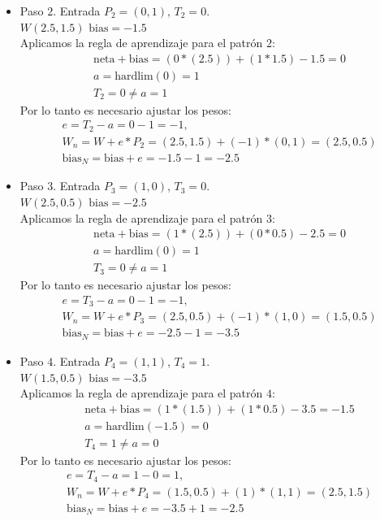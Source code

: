 \documentclass{article}
\begin{document}
{{\begin{itemize}
\begin{itemize}
\item Paso $2$. Entrada $P_2 = (0, 1)$, $T_2 = 0$. \\
$W(2.5, 1.5)$  $\text{bias} = -1.5$ \\

Aplicamos la regla de aprendizaje para el patrón $2$:
\begin{align*}
&\text{neta} + \text{bias}= (0 * (2.5)) + (1 * 1.5) - 1.5 = 0\\
&a = \text{hardlim}(0) = 1 \\
&T_2 = 0 \neq a = 1
\end{align*}
Por lo tanto es necesario ajustar los pesos:
\begin{align*}
&e = T_2 - a = 0- 1 =  -1, \\
&W_n = W + e* P_2 = (2.5, 1.5) + (-1) * (0,1) = (2.5, 0.5) \\
&\text{bias}_N = \text{bias} + e = -1.5 - 1 = -2.5
\end{align*}

\item Paso $3$. Entrada $P_3 = (1, 0)$, $T_3 = 0$. \\
$W(2.5, 0.5)$  $\text{bias} = -2.5$ \\

Aplicamos la regla de aprendizaje para el patrón $3$:
\begin{align*}
&\text{neta} + \text{bias}= (1 * (2.5)) + (0 * 0.5) - 2.5 = 0\\
&a = \text{hardlim}(0) = 1 \\
&T_3 = 0 \neq a = 1
\end{align*}
Por lo tanto es necesario ajustar los pesos:
\begin{align*}
&e = T_3 - a = 0- 1 =  -1, \\
&W_n = W + e* P_3 = (2.5, 0.5) + (-1) * (1,0) = (1.5, 0.5) \\
&\text{bias}_N = \text{bias} + e = -2.5 - 1 = -3.5
\end{align*}

\item Paso $4$. Entrada $P_4 = (1, 1)$, $T_4 = 1$. \\
$W(1.5, 0.5)$  $\text{bias} = -3.5$ \\

Aplicamos la regla de aprendizaje para el patrón $4$:
\begin{align*}
&\text{neta} + \text{bias}= (1 * (1.5)) + (1 * 0.5) - 3.5 = -1.5\\
&a = \text{hardlim}(-1.5) = 0 \\
&T_4 = 1 \neq a = 0
\end{align*}
Por lo tanto es necesario ajustar los pesos:
\begin{align*}
&e = T_4 - a = 1- 0 =  1, \\
&W_n = W + e* P_4= (1.5, 0.5) + (1) * (1,1) = (2.5, 1.5) \\
&\text{bias}_N = \text{bias} + e = -3.5 + 1 = -2.5
\end{align*}
\end{itemize}


\end{itemize}}}
\end{document}
